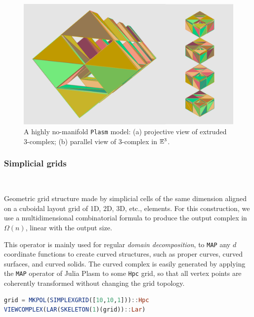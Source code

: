 \documentclass{juliacon}
\begin{document}
\begin{figure}[htbp] %
\includegraphics[width=\linewidth]{figs/multi-extrusion-02}
\caption{A highly no-manifold {\tt Plasm} model: (a) projective view of extruded 3-complex; (b) parallel view of 3-complex in $\mathbb{E}^3$.}
\label{fig:multi-extrusion-02}
\end{figure}


\subsubsection*{Simplicial grids}\ 


Geometric grid structure made by simplicial cells of the same dimension aligned on a cuboidal layout grid of 1D, 2D, 3D, etc., elements. For this construction, we use a multidimensional combinatorial formula to produce the output complex in $\Omega(n)$, linear with the output size.

This operator is mainly used for regular \emph{domain decomposition}, to {\tt MAP} any $d$ coordinate functions to create curved structures, such as proper curves, curved surfaces, and curved solids.
The curved complex is easily generated by applying the {\tt MAP} operator of Julia Plasm to some {\tt Hpc} grid, so that all vertex points are coherently transformed without changing the grid topology.

\begin{lstlisting}[language = Julia,numbers=none,label={lst:exmpl10},
caption={Multidimensional grid generation.}
]
grid = MKPOL(SIMPLEXGRID([10,10,1]))::Hpc
VIEWCOMPLEX(LAR(SKELETON(1)(grid))::Lar)
\end{lstlisting}
\end{document}
